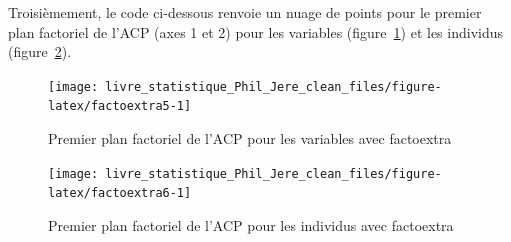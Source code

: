 \documentclass[
  11pt,
  french,
]{book}
\makeatletter
\newenvironment{Shaded}{\begin{snugshade}}{\end{snugshade}}
\newcommand{\CommentTok}[1]{\textcolor[rgb]{0.56,0.35,0.01}{\textit{#1}}}
\newcommand{\DataTypeTok}[1]{\textcolor[rgb]{0.13,0.29,0.53}{#1}}
\newcommand{\DecValTok}[1]{\textcolor[rgb]{0.00,0.00,0.81}{#1}}
\newcommand{\FloatTok}[1]{\textcolor[rgb]{0.00,0.00,0.81}{#1}}
\newcommand{\KeywordTok}[1]{\textcolor[rgb]{0.13,0.29,0.53}{\textbf{#1}}}
\newcommand{\NormalTok}[1]{#1}
\newcommand{\OperatorTok}[1]{\textcolor[rgb]{0.81,0.36,0.00}{\textbf{#1}}}
\newcommand{\StringTok}[1]{\textcolor[rgb]{0.31,0.60,0.02}{#1}}
\newenvironment{kframe}{%
\medskip{}
\setlength{\fboxsep}{.8em}
 \def\at@end@of@kframe{}%
 \ifinner\ifhmode%
  \def\at@end@of@kframe{\end{minipage}}%
  \begin{minipage}{\columnwidth}%
 \fi\fi%
 \def\FrameCommand##1{\hskip\@totalleftmargin \hskip-\fboxsep
 \colorbox{shadecolor}{##1}\hskip-\fboxsep
     \hskip-\linewidth \hskip-\@totalleftmargin \hskip\columnwidth}%
 \MakeFramed {\advance\hsize-\width
   \@totalleftmargin\z@ \linewidth\hsize
   \@setminipage}}%
 {\par\unskip\endMakeFramed%
 \at@end@of@kframe}
\renewenvironment{Shaded}{\begin{kframe}}{\end{kframe}}
\makeatother
\begin{document}
Troisièmement, le code ci-dessous renvoie un nuage de points pour le premier plan factoriel de l'ACP (axes 1 et 2) pour les variables (figure~\ref{fig:factoextra5}) et les individus (figure~\ref{fig:factoextra6}).

\begin{Shaded}
\end{Shaded}

\begin{figure}

{\centering \texttt{[image: livre\_statistique\_Phil\_Jere\_clean\_files/figure-latex/factoextra5-1]} 

}

\caption{Premier plan factoriel de l'ACP pour les variables avec factoextra}\label{fig:factoextra5}
\end{figure}

\begin{figure}

{\centering \texttt{[image: livre\_statistique\_Phil\_Jere\_clean\_files/figure-latex/factoextra6-1]} 

}

\caption{Premier plan factoriel de l'ACP pour les individus avec factoextra}\label{fig:factoextra6}
\end{figure}
\end{document}
